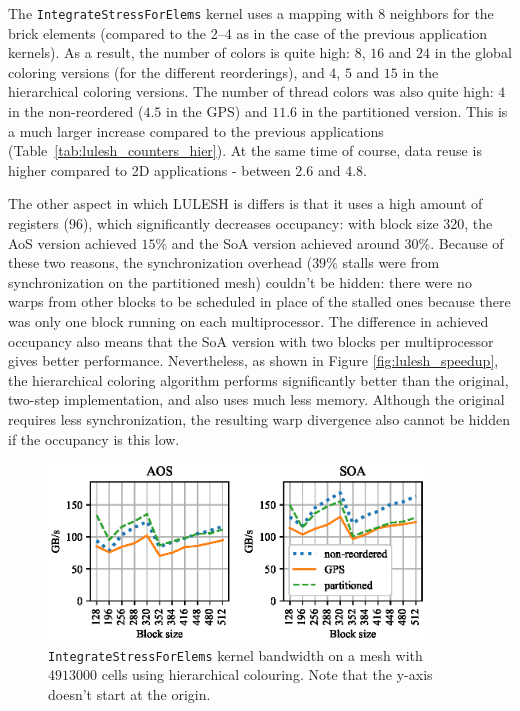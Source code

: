 The \texttt{IntegrateStressForElems} kernel uses a mapping with 8 neighbors for 
the brick elements (compared to the 2--4 as in the case of the previous 
application kernels). As a result, the number of colors is quite high: $8$, $16$ 
and $24$ in the global coloring versions (for the different reorderings), and 
$4$, $5$ and $15$ in the hierarchical coloring versions. The number of thread 
colors was also quite high: $4$ in the non-reordered ($4.5$ in the GPS) and 
$11.6$ in the partitioned version. This is a much larger increase compared to 
the previous applications (Table~\ref{tab:lulesh_counters_hier}). At the same 
time of course, data reuse is higher compared to 2D applications - between 
$2.6$ and $4.8$.

The other aspect in which LULESH is differs is that it uses a high amount of
registers ($96$), which significantly decreases occupancy: with block size 320, 
the AoS version achieved $15\%$ and the SoA version achieved around $30\%$. 
Because of these two reasons, the synchronization overhead ($39\%$ stalls were 
from synchronization on the partitioned mesh) couldn't be hidden: there were no 
warps from other blocks to be scheduled in place of the stalled ones because
there was only one block running on each multiprocessor. The difference in 
achieved occupancy also means that the SoA version with two blocks 
per multiprocessor gives better performance. Nevertheless, as shown in Figure 
\ref{fig:lulesh_speedup}, the hierarchical coloring algorithm performs 
significantly better than the original, two-step implementation, and also uses 
much less memory. Although the original requires less synchronization, the 
resulting warp divergence also cannot be hidden if the occupancy is this low.
 
\begin{figure}[Htbp]
  \centering
  \includegraphics[width=10cm]{fig/lulesh_bw-vs-bs_hier.eps}
  \caption{\texttt{IntegrateStressForElems} kernel bandwidth on a mesh with
  $4913000$ cells using hierarchical colouring. Note that the y-axis doesn't
  start at the origin.}
  \label{fig:lulesh_bw-vs-bs_hier}
\end{figure}

